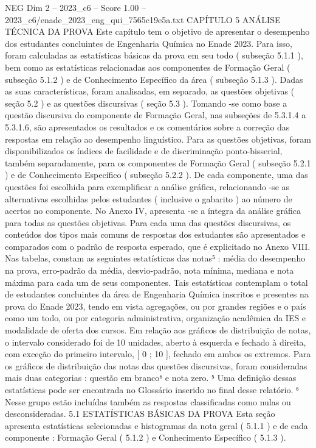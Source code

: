 \begin{textsample}{NEG Dim 2 – 2023\_c6 – Score 1.00 – 2023\_c6/enade\_2023\_eng\_qui\_7565c19e5a.txt}  \label{ex:f2_neg_269}
CAPÍTULO 5 ANÁLISE TÉCNICA DA PROVA Este capítulo tem o objetivo de apresentar o desempenho dos estudantes concluintes de Engenharia Química no Enade 2023.
Para isso, foram calculadas as estatísticas básicas da prova em seu todo ( subseção 5.1.1 ), bem como as estatísticas relacionadas aos componentes de Formação Geral ( subseção 5.1.2 ) e de Conhecimento Específico da área ( subseção 5.1.3 ).
Dadas as suas características, foram analisadas, em separado, as questões objetivas ( seção 5.2 ) e as questões discursivas ( seção 5.3 ).
Tomando -se como base a questão discursiva do componente de Formação Geral, nas subseções de 5.3.1.4 a 5.3.1.6, são apresentados os resultados e os comentários sobre a correção das respostas em relação ao desempenho linguístico.
Para as questões objetivas, foram disponibilizados os índices de facilidade e de discriminação ponto-bisserial, também separadamente, para os componentes de Formação Geral ( subseção 5.2.1 ) e de Conhecimento Específico ( subseção 5.2.2 ).
De cada componente, uma das questões foi escolhida para exemplificar a análise gráfica, relacionando -se as alternativas escolhidas pelos estudantes ( inclusive o gabarito ) ao número de acertos no componente.
No Anexo IV, apresenta -se a íntegra da análise gráfica para todas as questões objetivas.
Para cada uma das questões discursivas, os conteúdos dos tipos mais comuns de respostas dos estudantes são apresentados e comparados com o padrão de resposta esperado, que é explicitado no Anexo VIII.
Nas tabelas, constam as seguintes estatísticas das notas⁵ : média do desempenho na prova, erro-padrão da média, desvio-padrão, nota mínima, mediana e nota máxima para cada um de seus componentes.
Tais estatísticas contemplam o total de estudantes concluintes da área de Engenharia Química inscritos e presentes na prova do Enade 2023, tendo em vista agregações, ou por grandes regiões e o país como um todo, ou por categoria administrativa, organização acadêmica da IES e modalidade de oferta dos cursos.
Em relação aos gráficos de distribuição de notas, o intervalo considerado foi de 10 unidades, aberto à esquerda e fechado à direita, com exceção do primeiro intervalo, [ 0 ; 10 ], fechado em ambos os extremos.
Para os gráficos de distribuição das notas das questões discursivas, foram consideradas mais duas categorias : questão em branco⁶ e nota zero. ⁵ Uma definição dessas estatísticas pode ser encontrada no Glossário inserido no final desse relatório. ⁶ Nesse grupo estão incluídas também as respostas classificadas como nulas ou desconsideradas. 5.1 ESTATÍSTICAS BÁSICAS DA PROVA Esta seção apresenta estatísticas selecionadas e histogramas da nota geral ( 5.1.1 ) e de cada componente : Formação Geral ( 5.1.2 ) e Conhecimento Específico ( 5.1.3 ).

\end{textsample}
